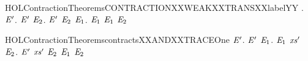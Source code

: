 \newcommand{\HOLContractionTheoremsCONTRACTIONXXSUBSETXXcontracts}{\UseVerbatim{HOLContractionTheoremsCONTRACTIONXXSUBSETXXcontracts}}
\begin{SaveVerbatim}{HOLContractionTheoremsCONTRACTIONXXWEAKXXTRANSXXlabelYY}
\HOLTokenTurnstile{} \HOLSymConst{\HOLTokenForall{}}.
       \HOLSymConst{\HOLTokenImp{}}
     \HOLSymConst{\HOLTokenForall{}} \ensuremath{\HOLBoundVar{E}\sp{\prime{}}}.
         \ensuremath{\HOLBoundVar{E}\sp{\prime{}}} \HOLSymConst{\HOLTokenImp{}}
       \HOLSymConst{\HOLTokenForall{}} \ensuremath{\HOLBoundVar{E}\sb{\mathrm{2}}}.
         \ensuremath{\HOLBoundVar{E}\sp{\prime{}}} \HOLTokenWeakTransBegin{} \HOLTokenWeakTransEnd \ensuremath{\HOLBoundVar{E}\sb{\mathrm{2}}} \HOLSymConst{\HOLTokenImp{}}
         \HOLSymConst{\HOLTokenExists{}}\ensuremath{\HOLBoundVar{E}\sb{\mathrm{1}}}.  \HOLTokenWeakTransBegin{} \HOLTokenWeakTransEnd \ensuremath{\HOLBoundVar{E}\sb{\mathrm{1}}} \HOLSymConst{\HOLTokenConj{}}  \ensuremath{\HOLBoundVar{E}\sb{\mathrm{1}}} \ensuremath{\HOLBoundVar{E}\sb{\mathrm{2}}}
\end{SaveVerbatim}
\newcommand{\HOLContractionTheoremsCONTRACTIONXXWEAKXXTRANSXXlabelYY}{\UseVerbatim{HOLContractionTheoremsCONTRACTIONXXWEAKXXTRANSXXlabelYY}}
\begin{SaveVerbatim}{HOLContractionTheoremscontractsXXANDXXTRACEOne}
\HOLTokenTurnstile{} \HOLSymConst{\HOLTokenForall{}} \ensuremath{\HOLBoundVar{E}\sp{\prime{}}}.
       \ensuremath{\HOLBoundVar{E}\sp{\prime{}}} \HOLSymConst{\HOLTokenImp{}}
     \HOLSymConst{\HOLTokenForall{}} \ensuremath{\HOLBoundVar{E}\sb{\mathrm{1}}}.
          \ensuremath{\HOLBoundVar{E}\sb{\mathrm{1}}} \HOLSymConst{\HOLTokenImp{}}
       \HOLSymConst{\HOLTokenExists{}}\ensuremath{\HOLBoundVar{xs}\sp{\prime{}}} \ensuremath{\HOLBoundVar{E}\sb{\mathrm{2}}}.  \ensuremath{\HOLBoundVar{E}\sp{\prime{}}} \ensuremath{\HOLBoundVar{xs}\sp{\prime{}}} \ensuremath{\HOLBoundVar{E}\sb{\mathrm{2}}} \HOLSymConst{\HOLTokenConj{}} \ensuremath{\HOLBoundVar{E}\sb{\mathrm{1}}}  \ensuremath{\HOLBoundVar{E}\sb{\mathrm{2}}}
\end{SaveVerbatim}
\newcommand{\HOLContractionTheoremscontractsXXANDXXTRACEOne}{\UseVerbatim{HOLContractionTheoremscontractsXXANDXXTRACEOne}}
